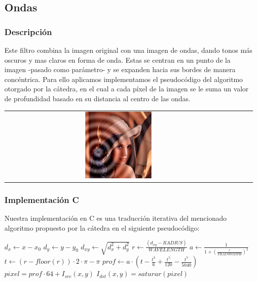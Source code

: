 \subsection{Ondas}

\subsubsection{Descripción}

\begin{multicols}{2}
  Este filtro combina la imagen original con una imagen de ondas, dando tonos más oscuros y mas claros en forma de onda. Estas se centran en un punto de la imagen -pasado como parámetro- y se expanden hacia sus bordes de manera concéntrica. Para ello aplicamos implementamos el pseudocódigo del algoritmo otorgado por la cátedra, en el cual a cada píxel de la imagen se le suma un valor de profundidad basado en su distancia al centro de las ondas.
  \begin{center}
    \begin{tabular}{cccc}
      \includegraphics[width=0.3\textwidth]{imagenes/lenaONDA.jpg} \\
    \end{tabular}
     \end{center}
  \end{multicols}

\subsubsection{Implementación C}

Nuestra implementación en C es una traducción iterativa del mencionado algoritmo propuesto por la cátedra en el siguiente pseudocódigo:

\begin{algorithm}[H]
  \begin{algorithmic}[1]
      \STATE $d_x \gets x - x_0$
      \STATE
      \STATE $d_y \gets y - y_0$
      \STATE
      \STATE $d_{xy} \gets \sqrt{d_{x}^2+d_{y}^2}$
      \STATE
      \STATE $r \gets \frac{(d_{xy} - RADIUS)}{WAVELENGTH}$
      \STATE
      \STATE $a \gets \frac{1}{1 + (\frac{r}{TRAINWIDTH})^2 }$
      \STATE
      \STATE $t \gets ( r-floor(r) ) \cdot 2 \cdot \pi - \pi$
      \STATE
      \STATE $prof \gets a \cdot (t - \frac{t^3}{6}+\frac{t^5}{120}-\frac{t^7}{5040})$
      \STATE
      \STATE $pixel = prof \cdot 64 + I_{src}(x, y)$    
      \STATE
      \STATE $I_{dst}(x, y) = saturar(pixel)$
    \ENDFOR
  \end{algorithmic}
  \caption{$ondas (I_{src}, I_{dst}, x_0, y_0)$}
  \label{alg:ondas}
\end{algorithm}

